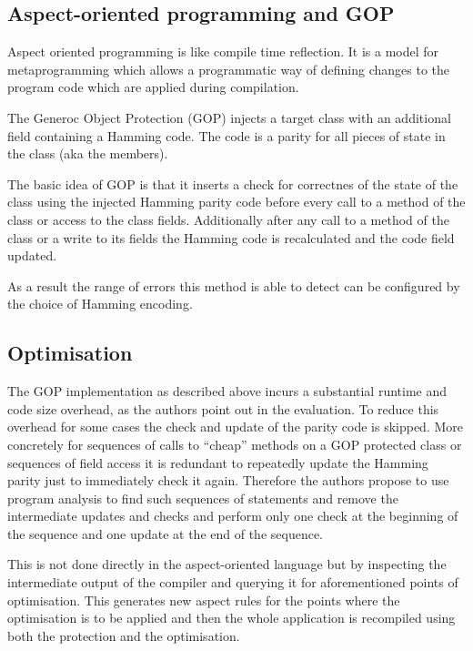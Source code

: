 \documentclass[paper=a4, fontsize=11pt]{scrartcl} %
\numberwithin{equation}{section} %
\numberwithin{figure}{section} %
\numberwithin{table}{section} %
\begin{document}
\subsection{Aspect-oriented programming and GOP}

Aspect oriented programming is like compile time reflection.
It is a model for metaprogramming which allows a programmatic way of defining changes to the program code which are applied during compilation.

The Generoc Object Protection (GOP) injects a target class with an additional field containing a Hamming code.
The code is a parity for all pieces of state in the class (aka the members).

The basic idea of GOP is that it inserts a check for correctnes of the state of the class using the injected Hamming parity code before every call to a method of the class or access to the class fields.
Additionally after any call to a method of the class or a write to its fields the Hamming code is recalculated and the code field updated.

As a result the range of errors this method is able to detect can be configured by the choice of Hamming encoding.

\subsection{Optimisation}

The GOP implementation as described above incurs a substantial runtime and code size overhead, as the authors point out in the evaluation.
To reduce this overhead for some cases the check and update of the parity code is skipped.
More concretely for sequences of calls to ``cheap'' methods on a GOP protected class or sequences of field access it is redundant to repeatedly update the Hamming parity just to immediately check it again.
Therefore the authors propose to use program analysis to find such sequences of statements and remove the intermediate updates and checks and perform only one check at the beginning of the sequence and one update at the end of the sequence.

This is not done directly in the aspect-oriented language but by inspecting the intermediate output of the compiler and querying it for aforementioned points of optimisation.
This generates new aspect rules for the points where the optimisation is to be applied and then the whole application is recompiled using both the protection and the optimisation.
\end{document}
